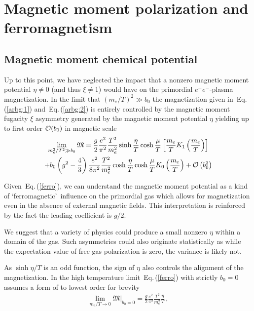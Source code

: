 \documentclass[aps,prd,floatfix,reprint]{revtex4-2}
\newcommand{\req}[1]{Eq.\,(\ref{#1})}
\begin{document}
\section{Magnetic moment polarization and ferromagnetism}
\label{sec:ferro}
\subsection{Magnetic moment chemical potential}
\label{sec:spinpot}
\noindent Up to this point, we have neglected the impact that a nonzero magnetic moment potential $\eta\neq0$ (and thus $\xi\neq1$) would have on the primordial $e^{+}e^{-}$-plasma magnetization. In the limit that $(m_{e}/T)^2\gg b_0$ the magnetization given in~\req{arbg:1} and~\req{arbg:2} is entirely controlled by the magnetic moment fugacity $\xi$ asymmetry generated by the magnetic moment potential $\eta$ yielding up to first order ${\cal O}(b_{0})$ in magnetic scale
\begin{multline}
 \label{ferro}
 \lim_{m_{e}^{2}/T^{2}\gg b_0}{\mathfrak M}=\frac{g}{2}\frac{e^{2}}{\pi^{2}}\frac{T^{2}}{m_{e}^{2}}\sinh{\frac{\eta}{T}}\cosh{\frac{\mu}{T}}\left[\frac{m_{e}}{T}K_{1}\left(\frac{m_{e}}{T}\right)\right]\\
 +b_{0}\left(g^{2}-\frac{4}{3}\right)\frac{e^{2}}{8\pi^{2}}\frac{T^{2}}{m_{e}^{2}}\cosh{\frac{\eta}{T}}\cosh{\frac{\mu}{T}}K_{0}\left(\frac{m_{e}}{T}\right)
 +{\cal O}\left(b_{0}^{2}\right)
\end{multline}

Given~\req{ferro}, we can understand the magnetic moment potential as a kind of \lq ferromagnetic\rq\ influence on the primordial gas which allows for magnetization even in the absence of external magnetic fields. This interpretation is reinforced by the fact the leading coefficient is $g/2$.

We suggest that a variety of physics could produce a small nonzero $\eta$ within a domain of the gas. Such asymmetries could also originate statistically as while the expectation value of free gas polarization is zero, the variance is likely not.

As $\sinh{\eta/T}$ is an odd function, the sign of $\eta$ also controls the alignment of the magnetization. In the high temperature limit~\req{ferro} with strictly $b_{0}=0$ assumes a form of to lowest order for brevity
\begin{align}
 \label{hiTferro}
 \lim_{m_{e}/T\rightarrow0}{\mathfrak M}\vert_{b_{0}=0}=\frac{g}{2}\frac{e^{2}}{\pi^{2}}\frac{T^{2}}{m_{e}^{2}}\frac{\eta}{T}\,,
\end{align}
\end{document}
